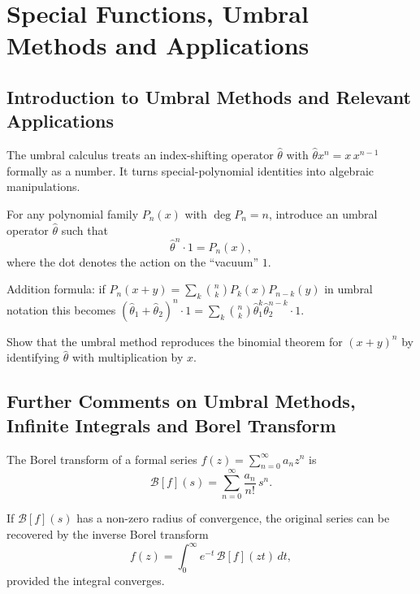 \chapter{Special Functions, Umbral Methods and Applications}

\section{Introduction to Umbral Methods and Relevant Applications}

The umbral calculus treats an index-shifting operator $\hat\theta$ with
$\hat\theta x^n = x\,x^{n-1}$ formally as a number. It turns special-polynomial
identities into algebraic manipulations.

For any polynomial family $P_n(x)$ with $\deg P_n=n$, introduce an
umbral operator $\hat\theta$ such that
\begin{equation}
\hat\theta^n\cdot 1 = P_n(x),
\label{eq:9.1.1}
\end{equation}
where the dot denotes the action on the ``vacuum'' $1$.

Addition formula: if $P_n(x+y)=\sum_k\binom{n}{k}P_k(x)P_{n-k}(y)$ in umbral
notation this becomes
$(\hat\theta_1+\hat\theta_2)^n\cdot1 = \sum_k\binom{n}{k}\hat\theta_1^k\hat\theta_2^{n-k}\cdot1$.

\begin{exercise}
Show that the umbral method reproduces the binomial theorem for
$(x+y)^n$ by identifying $\hat\theta$ with multiplication by $x$.
\end{exercise}

\section{Further Comments on Umbral Methods, Infinite Integrals and Borel Transform}

The Borel transform of a formal series
$f(z)=\sum_{n=0}^\infty a_n z^n$ is
\begin{equation}
\mathcal B[f](s) = \sum_{n=0}^\infty \frac{a_n}{n!}\,s^n.
\label{eq:9.2.1}
\end{equation}

If $\mathcal B[f](s)$ has a non-zero radius of convergence, the original
series can be recovered by the inverse Borel transform
\begin{equation}
f(z) = \int_0^\infty e^{-t}\,\mathcal B[f](zt)\,dt,
\label{eq:9.2.2}
\end{equation}
provided the integral converges.

